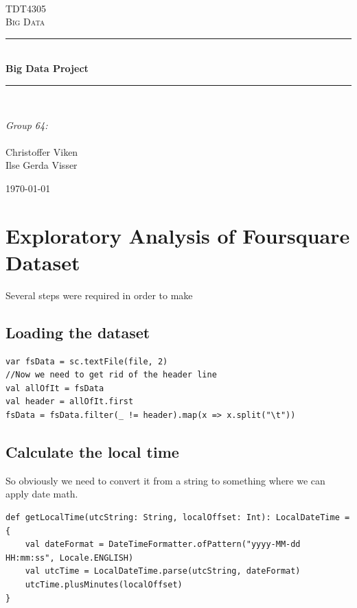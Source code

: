 \documentclass[abstract=on]{article}
\title{\mytitle}
\author{\myauthor}
\date{\today}
\newcommand{\mytitle}{Big Data Project}
\newcommand{\mygroupnumber}{64}
\newcommand{\myauthor}{Christoffer Viken\\Ilse Gerda Visser}
\begin{document}
\begin{titlepage}
\begin{center}

 
~\\[1.5cm]

\textsc{\Large TDT4305\\Big Data}\\[0.5cm]

\hrule ~\\[0.2cm]
{\huge \bfseries \mytitle}\\[0.4cm]   %
\hrule ~\\[1.5cm]

\begin{minipage}{0.4\textwidth}
    \centering
  \large
    \emph{Group \mygroupnumber:}\\~\\
    \myauthor
\end{minipage}

\vfill

{\large \today}
\end{center}
\end{titlepage}




\section{Exploratory Analysis of Foursquare Dataset}
Several steps were required in order to make 

\subsection{Loading the dataset}
\begin{lstlisting}
var fsData = sc.textFile(file, 2)
//Now we need to get rid of the header line
val allOfIt = fsData
val header = allOfIt.first
fsData = fsData.filter(_ != header).map(x => x.split("\t"))
\end{lstlisting}

\subsection{Calculate the local time}
So obviously we need to convert it from a string to something where we can apply date math.
\begin{lstlisting}
def getLocalTime(utcString: String, localOffset: Int): LocalDateTime = {
    val dateFormat = DateTimeFormatter.ofPattern("yyyy-MM-dd HH:mm:ss", Locale.ENGLISH)
    val utcTime = LocalDateTime.parse(utcString, dateFormat)
    utcTime.plusMinutes(localOffset)
}
\end{lstlisting}
\end{document}
